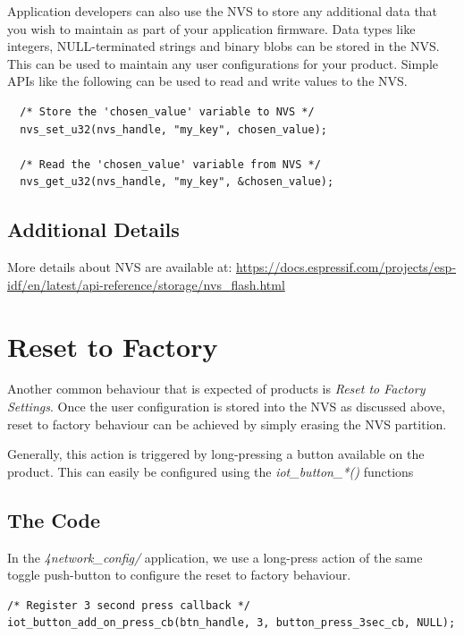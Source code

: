 \documentclass[11pt,fleqn]{book} %
\begin{document}
Application developers can also use the NVS to store any additional data that you wish to maintain as part of your application firmware. Data types like integers, NULL-terminated strings and binary blobs can be stored in the NVS. This can be used to maintain any user configurations for your product. Simple APIs like the following can be used to read and write values to the NVS.

\begin{verbatim}
  /* Store the 'chosen_value' variable to NVS */
  nvs_set_u32(nvs_handle, "my_key", chosen_value);

  /* Read the 'chosen_value' variable from NVS */
  nvs_get_u32(nvs_handle, "my_key", &chosen_value);
\end{verbatim}


\subsection{Additional Details}

More details about NVS are available at: \url{https://docs.espressif.com/projects/esp-idf/en/latest/api-reference/storage/nvs_flash.html}

\section{Reset to Factory}
Another common behaviour that is expected of products is \textit{Reset to Factory Settings}. Once the user configuration is stored into the NVS as discussed above, reset to factory behaviour can be achieved by simply erasing the NVS partition.

Generally, this action is triggered by long-pressing a button available on the product. This can easily be configured using the \textit{iot\_button\_*()} functions

\subsection{The Code}\label{sec:reset_to_factory}
In the \textit{4network\_config/} application, we use a long-press action of the same toggle push-button to configure the reset to factory behaviour.

\begin{verbatim}
/* Register 3 second press callback */  
iot_button_add_on_press_cb(btn_handle, 3, button_press_3sec_cb, NULL);
\end{verbatim}
\end{document}
